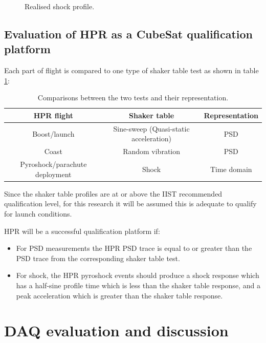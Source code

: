 \documentclass[]{report}
\begin{document}
\begin{figure}[H]
  \centering
  
  \caption{Realised shock profile.}
  \label{fig:shock-table-profile}
\end{figure}

\section{Evaluation of HPR as a CubeSat qualification platform}

Each part of flight is compared to one type of shaker table test as shown in table \ref{tabl:compare-tests}:

\begin{table}[H]
  \centering
  \begin{tabular}{|c|c|c|}
    \hline
    \textbf{HPR flight}            & \textbf{Shaker table}                  & \textbf{Representation} \\\hline
    Boost/launch                   & Sine-sweep (Quasi-static acceleration) & PSD                     \\\hline
    Coast                          & Random vibration                       & PSD                     \\\hline
    Pyroshock/parachute deployment & Shock                                  & Time domain             \\\hline
  \end{tabular}
  \caption{Comparisons between the two tests and their representation.}
  \label{tabl:compare-tests}
\end{table}

Since the shaker table profiles are at or above the IIST recommended qualification level, for this research it will be assumed this is adequate to qualify for launch conditions.

HPR will be a successful qualification platform if:
\begin{itemize}
  \item For PSD measurements the HPR PSD trace is equal to or greater than the PSD trace from the corresponding shaker table test.
  \item For shock, the HPR pyroshock events should produce a shock response which has a half-sine profile time which is less than the shaker table response, and a peak acceleration which is greater than the shaker table response.
\end{itemize}

\chapter{DAQ evaluation and discussion}
\end{document}
